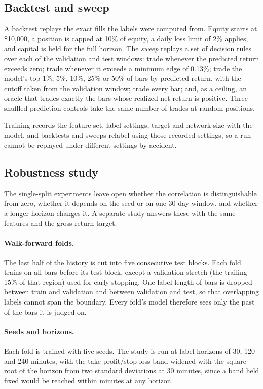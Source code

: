 \documentclass[11pt,a4paper]{article}
\begin{document}
\subsection{Backtest and sweep}

A backtest replays the exact fills the labels were computed from. Equity
starts at \$10,000, a position is capped at 10\% of equity, a daily loss limit
of 2\% applies, and capital is held for the full horizon. The \emph{sweep}
replays a set of decision rules over each of the validation and test windows:
trade whenever the predicted return exceeds zero; trade whenever it exceeds a
minimum edge of 0.13\%; trade the model's top 1\%, 5\%, 10\%, 25\% or 50\% of
bars by predicted return, with the cutoff taken from the validation window;
trade every bar; and, as a ceiling, an oracle that trades exactly the bars
whose realized net return is positive. Three shuffled-prediction controls
take the same number of trades at random positions.

Training records the feature set, label settings, target and network size with
the model, and backtests and sweeps relabel using those recorded settings, so
a run cannot be replayed under different settings by accident.

\subsection{Robustness study}
\label{sec:study}

The single-split experiments leave open whether the correlation is
distinguishable from zero, whether it depends on the seed or on one 30-day
window, and whether a longer horizon changes it. A separate study answers
these with the same features and the gross-return target.

\paragraph{Walk-forward folds.}
The last half of the history is cut into five consecutive test blocks. Each
fold trains on all bars before its test block, except a validation stretch
(the trailing 15\% of that region) used for early stopping. One label length
of bars is dropped between train and validation and between validation and
test, so that overlapping labels cannot span the boundary. Every fold's model
therefore sees only the past of the bars it is judged on.

\paragraph{Seeds and horizons.}
Each fold is trained with five seeds. The study is run at label horizons of 30,
120 and 240 minutes, with the take-profit/stop-loss band widened with the
square root of the horizon from two standard deviations at 30 minutes, since a
band held fixed would be reached within minutes at any horizon.
\end{document}
